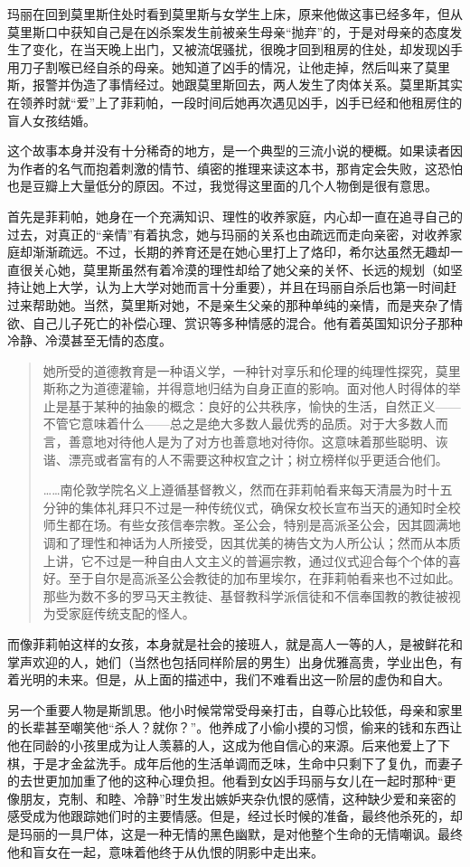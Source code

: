 玛丽在回到莫里斯住处时看到莫里斯与女学生上床，原来他做这事已经多年，但从莫里斯口中获知自己是在凶杀案发生前被亲生母亲“抛弃”的，于是对母亲的态度发生了变化，在当天晚上出门，又被流氓骚扰，很晚才回到租房的住处，却发现凶手用刀子割喉已经自杀的母亲。她知道了凶手的情况，让他走掉，然后叫来了莫里斯，报警并伪造了事情经过。她跟莫里斯回去，两人发生了肉体关系。莫里斯其实在领养时就“爱”上了菲莉帕，一段时间后她再次遇见凶手，凶手已经和他租房住的盲人女孩结婚。

这个故事本身并没有十分稀奇的地方，是一个典型的三流小说的梗概。如果读者因为作者的名气而抱着刺激的情节、缜密的推理来读这本书，那肯定会失败，这恐怕也是豆瓣上大量低分的原因。不过，我觉得这里面的几个人物倒是很有意思。

首先是菲莉帕，她身在一个充满知识、理性的收养家庭，内心却一直在追寻自己的过去，对真正的“亲情”有着执念，她与玛丽的关系也由疏远而走向亲密，对收养家庭却渐渐疏远。不过，长期的养育还是在她心里打上了烙印，希尔达虽然无趣却一直很关心她，莫里斯虽然有着冷漠的理性却给了她父亲的关怀、长远的规划（如坚持让她上大学，认为上大学对她而言十分重要），并且在玛丽自杀后也第一时间赶过来帮助她。当然，莫里斯对她，不是亲生父亲的那种单纯的亲情，而是夹杂了情欲、自己儿子死亡的补偿心理、赏识等多种情感的混合。他有着英国知识分子那种冷静、冷漠甚至无情的态度。
\begin{quotation}
她所受的道德教育是一种语义学，一种针对享乐和伦理的纯理性探究，莫里斯称之为道德灌输，并得意地归结为自身正直的影响。面对他人时得体的举止是基于某种的抽象的概念：良好的公共秩序，愉快的生活，自然正义——不管它意味着什么——总之是绝大多数人最优秀的品质。对于大多数人而言，善意地对待他人是为了对方也善意地对待你。这意味着那些聪明、诙谐、漂亮或者富有的人不需要这种权宜之计；树立榜样似乎更适合他们。

……南伦敦学院名义上遵循基督教义，然而在菲莉帕看来每天清晨为时十五分钟的集体礼拜只不过是一种传统仪式，确保女校长宣布当天的通知时全校师生都在场。有些女孩信奉宗教。圣公会，特别是高派圣公会，因其圆满地调和了理性和神话为人所接受，因其优美的祷告文为人所公认；然而从本质上讲，它不过是一种自由人文主义的普遍宗教，通过仪式迎合每个个体的喜好。至于自尔是高派圣公会教徒的加布里埃尔，在菲莉帕看来也不过如此。那些为数不多的罗马天主教徒、基督教科学派信徒和不信奉国教的教徒被视为受家庭传统支配的怪人。
\end{quotation}
而像菲莉帕这样的女孩，本身就是社会的接班人，就是高人一等的人，是被鲜花和掌声欢迎的人，她们（当然也包括同样阶层的男生）出身优雅高贵，学业出色，有着光明的未来。但是，从上面的描述中，我们不难看出这一阶层的虚伪和自大。

另一个重要人物是斯凯思。他小时候常常受母亲打击，自尊心比较低，母亲和家里的长辈甚至嘲笑他“杀人？就你？”。他养成了小偷小摸的习惯，偷来的钱和东西让他在同龄的小孩里成为让人羡慕的人，这成为他自信心的来源。后来他爱上了下棋，于是才金盆洗手。成年后他的生活单调而乏味，生命中只剩下了复仇，而妻子的去世更加加重了他的这种心理负担。他看到女凶手玛丽与女儿在一起时那种“更像朋友，克制、和睦、冷静”时生发出嫉妒夹杂仇恨的感情，这种缺少爱和亲密的感受成为他跟踪她们时的主要情感。但是，经过长时候的准备，最终他杀死的，却是玛丽的一具尸体，这是一种无情的黑色幽默，是对他整个生命的无情嘲讽。最终他和盲女在一起，意味着他终于从仇恨的阴影中走出来。

